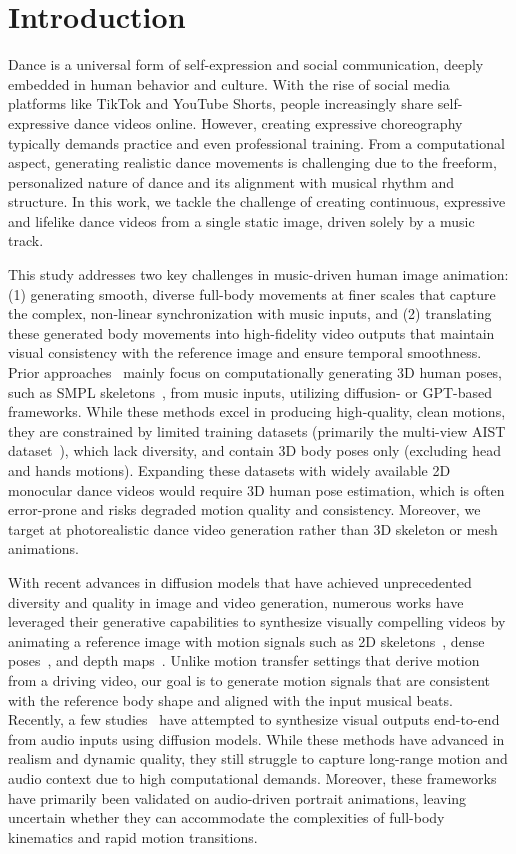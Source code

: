 \section{Introduction}
\label{sec:intro}

Dance is a universal form of self-expression and social communication, deeply embedded in human behavior and culture. With the rise of social media platforms like TikTok and YouTube Shorts, people increasingly share self-expressive dance videos online. However, creating expressive choreography typically demands practice and even professional training. From a computational aspect, generating realistic dance movements is challenging due to the freeform, personalized nature of dance and its alignment with musical rhythm and structure. In this work, we tackle the challenge of creating continuous, expressive and lifelike dance videos from a single static image, driven solely by a music track.


This study addresses two key challenges in music-driven human image animation: (1) generating smooth, diverse full-body movements at finer scales that capture the complex, non-linear synchronization with music inputs, and (2) translating these generated body movements into high-fidelity video outputs that maintain visual consistency with the reference image and ensure temporal smoothness. Prior approaches~\cite{bailando,edge} mainly focus on computationally generating 3D human poses, such as SMPL skeletons~\cite{loper2023smpl}, from music inputs, utilizing diffusion- or GPT-based frameworks. While these methods excel in producing high-quality, clean motions, they are constrained by limited training datasets (primarily the multi-view AIST dataset~\cite{aist-dance-db,aist++}), which lack diversity, and contain 3D body poses only (excluding head and hands motions). Expanding these datasets with widely available 2D monocular dance videos would require 3D human pose estimation, which is often error-prone and risks degraded motion quality and consistency. Moreover, we target at photorealistic dance video generation rather than 3D skeleton or mesh animations. 

With recent advances in diffusion models that have achieved unprecedented diversity and quality in image and video generation,  numerous works have leveraged their generative capabilities to synthesize visually compelling videos by animating a reference image with motion signals such as 2D skeletons~\cite{hu2024animate,chang2023magicpose}, dense poses~\cite{xu2024magicanimate}, and depth maps~\cite{zhu2024champ}. Unlike motion transfer settings that derive motion from a driving video, our goal is to generate motion signals that are consistent with the reference body shape and aligned with the input musical beats. Recently, a few studies~\cite{hallo,tian2024emo} have attempted to synthesize visual outputs end-to-end from audio inputs using diffusion models. While these methods have advanced in realism and dynamic quality, they still struggle to capture long-range motion and audio context due to high computational demands. Moreover, these frameworks have primarily been validated on audio-driven portrait animations, leaving uncertain whether they can accommodate the complexities of full-body kinematics and rapid motion transitions.

